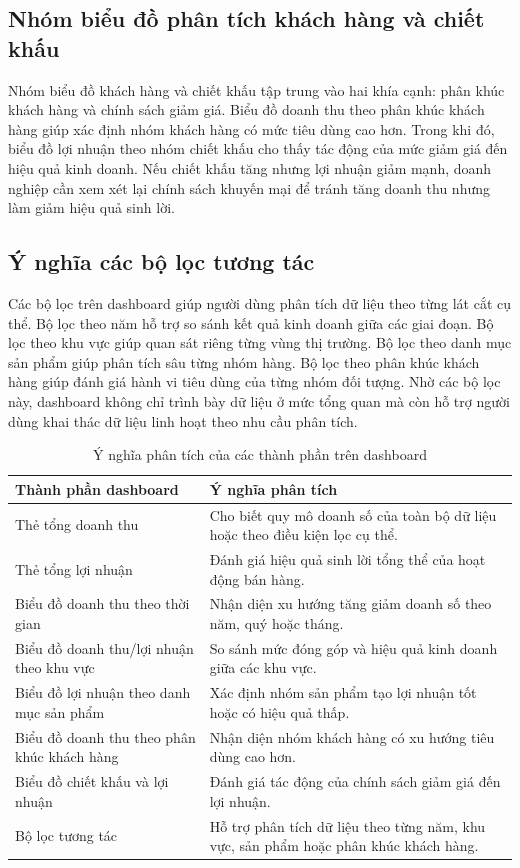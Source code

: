 \subsection*{\thesubsection\quad Nhóm biểu đồ phân tích khách hàng và chiết khấu}

Nhóm biểu đồ khách hàng và chiết khấu tập trung vào hai khía cạnh: phân khúc khách hàng và chính sách giảm giá. Biểu đồ doanh thu theo phân khúc khách hàng giúp xác định nhóm khách hàng có mức tiêu dùng cao hơn. Trong khi đó, biểu đồ lợi nhuận theo nhóm chiết khấu cho thấy tác động của mức giảm giá đến hiệu quả kinh doanh. Nếu chiết khấu tăng nhưng lợi nhuận giảm mạnh, doanh nghiệp cần xem xét lại chính sách khuyến mại để tránh tăng doanh thu nhưng làm giảm hiệu quả sinh lời.

\subsection*{\thesubsection\quad Ý nghĩa các bộ lọc tương tác}

Các bộ lọc trên dashboard giúp người dùng phân tích dữ liệu theo từng lát cắt cụ thể. Bộ lọc theo năm hỗ trợ so sánh kết quả kinh doanh giữa các giai đoạn. Bộ lọc theo khu vực giúp quan sát riêng từng vùng thị trường. Bộ lọc theo danh mục sản phẩm giúp phân tích sâu từng nhóm hàng. Bộ lọc theo phân khúc khách hàng giúp đánh giá hành vi tiêu dùng của từng nhóm đối tượng. Nhờ các bộ lọc này, dashboard không chỉ trình bày dữ liệu ở mức tổng quan mà còn hỗ trợ người dùng khai thác dữ liệu linh hoạt theo nhu cầu phân tích.

\begin{table}[H]
\centering
\caption{Ý nghĩa phân tích của các thành phần trên dashboard}
\label{tab:y-nghia-dashboard}
\begin{tabular}{p{4.5cm} p{8.5cm}}
\hline
\textbf{Thành phần dashboard} & \textbf{Ý nghĩa phân tích} \\
\hline
Thẻ tổng doanh thu & Cho biết quy mô doanh số của toàn bộ dữ liệu hoặc theo điều kiện lọc cụ thể. \\
\hline
Thẻ tổng lợi nhuận & Đánh giá hiệu quả sinh lời tổng thể của hoạt động bán hàng. \\
\hline
Biểu đồ doanh thu theo thời gian & Nhận diện xu hướng tăng giảm doanh số theo năm, quý hoặc tháng. \\
\hline
Biểu đồ doanh thu/lợi nhuận theo khu vực & So sánh mức đóng góp và hiệu quả kinh doanh giữa các khu vực. \\
\hline
Biểu đồ lợi nhuận theo danh mục sản phẩm & Xác định nhóm sản phẩm tạo lợi nhuận tốt hoặc có hiệu quả thấp. \\
\hline
Biểu đồ doanh thu theo phân khúc khách hàng & Nhận diện nhóm khách hàng có xu hướng tiêu dùng cao hơn. \\
\hline
Biểu đồ chiết khấu và lợi nhuận & Đánh giá tác động của chính sách giảm giá đến lợi nhuận. \\
\hline
Bộ lọc tương tác & Hỗ trợ phân tích dữ liệu theo từng năm, khu vực, sản phẩm hoặc phân khúc khách hàng. \\
\hline
\end{tabular}
\end{table}

